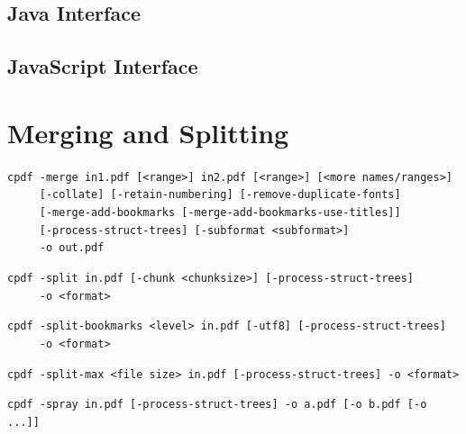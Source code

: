 \documentclass{book}
\begin{document}
\begin{jcpdflib}
\clearpage
\section*{Java Interface}
\begin{small}\tt




\end{small}
\end{jcpdflib}

\begin{jscpdflib}
\clearpage
\section*{JavaScript Interface}
\begin{small}\tt




\end{small}
\end{jscpdflib}

\chapter{Merging and Splitting}\label{chap:2}
  \begin{framed}
  \small
  \noindent\verb!cpdf -merge in1.pdf [<range>] in2.pdf [<range>] [<more names/ranges>]!\\
  \noindent\verb!     [-collate] [-retain-numbering] [-remove-duplicate-fonts]!\\
  \noindent\verb!     [-merge-add-bookmarks [-merge-add-bookmarks-use-titles]]!\\
  \noindent\verb!     [-process-struct-trees] [-subformat <subformat>]!\\
  \noindent\verb!     -o out.pdf!

  \vspace{1.5mm}
  \noindent\verb!cpdf -split in.pdf [-chunk <chunksize>] [-process-struct-trees]!\\
  \noindent\verb!     -o <format>!

  \vspace{1.5mm}
  \noindent\verb!cpdf -split-bookmarks <level> in.pdf [-utf8] [-process-struct-trees]!\\
  \noindent\verb!     -o <format>!

  \vspace{1.5mm}
  \noindent\verb!cpdf -split-max <file size> in.pdf [-process-struct-trees] -o <format>!

  \vspace{1.5mm}
  \noindent\verb!cpdf -spray in.pdf [-process-struct-trees] -o a.pdf [-o b.pdf [-o ...]]!
  \end{framed}
\end{document}
